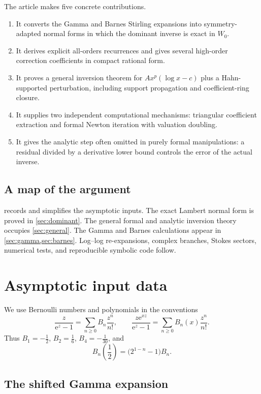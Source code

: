 \documentclass[11pt]{article}
\theoremstyle{definition}
\theoremstyle{remark}
\newcommand{\e}{\mathrm e}
\begin{document}
The article makes five concrete contributions.

\begin{enumerate}[label=\textup{(\roman*)}]
\item It converts the Gamma and Barnes Stirling expansions into symmetry-adapted normal forms in which the dominant inverse is exact in \(W_0\).
\item It derives explicit all-orders recurrences and gives several high-order correction coefficients in compact rational form.
\item It proves a general inversion theorem for
\(A x^p(\log x-c)\) plus a Hahn-supported perturbation, including support propagation and coefficient-ring closure.
\item It supplies two independent computational mechanisms: triangular coefficient extraction and formal Newton iteration with valuation doubling.
\item It gives the analytic step often omitted in purely formal manipulations: a residual divided by a derivative lower bound controls the error of the actual inverse.
\end{enumerate}

\subsection{A map of the argument}

 records and simplifies the asymptotic inputs.  The exact Lambert normal form is proved in \cref{sec:dominant}.  The general formal and analytic inversion theory occupies \cref{sec:general}.  The Gamma and Barnes calculations appear in \cref{sec:gamma,sec:barnes}.  Log--log re-expansions, complex branches, Stokes sectors, numerical tests, and reproducible symbolic code follow.

\section{Asymptotic input data}\label{sec:inputs}

We use Bernoulli numbers and polynomials in the conventions
\[
 \frac{z}{\e^z-1}=\sum_{n\ge0}B_n\frac{z^n}{n!},
 \qquad
 \frac{z\e^{xz}}{\e^z-1}=\sum_{n\ge0}B_n(x)\frac{z^n}{n!}.
\]
Thus \(B_1=-\tfrac12\), \(B_2=\tfrac16\), \(B_4=-\tfrac1{30}\), and
\[
 B_n\!\left(\frac12\right)=\bigl(2^{1-n}-1\bigr)B_n.
\]

\subsection{The shifted Gamma expansion}
\end{document}
